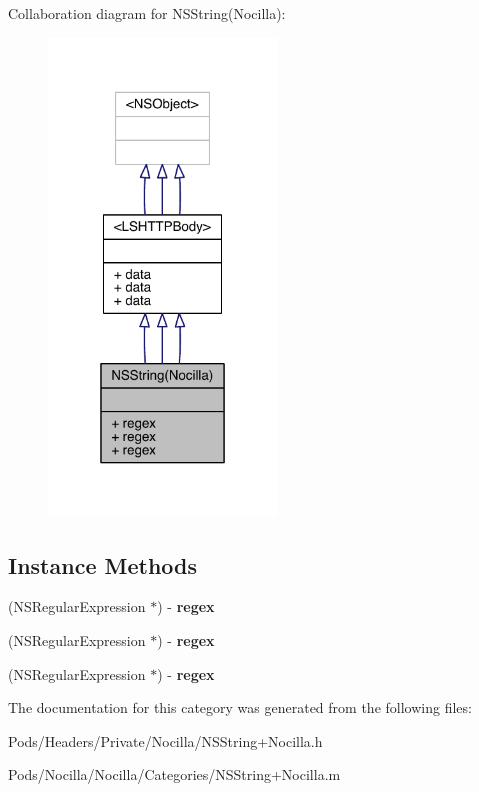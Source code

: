 Collaboration diagram for N\-S\-String(Nocilla)\-:\nopagebreak
\begin{figure}[H]
\begin{center}
\leavevmode
\includegraphics[width=172pt]{category_n_s_string_07_nocilla_08__coll__graph}
\end{center}
\end{figure}
\subsection*{Instance Methods}
\begin{DoxyCompactItemize}
\item 
\hypertarget{category_n_s_string_07_nocilla_08_a72d951dcb2d82a817c0bcf0ea7b38280}{(N\-S\-Regular\-Expression $\ast$) -\/ {\bfseries regex}}\label{category_n_s_string_07_nocilla_08_a72d951dcb2d82a817c0bcf0ea7b38280}

\item 
\hypertarget{category_n_s_string_07_nocilla_08_a72d951dcb2d82a817c0bcf0ea7b38280}{(N\-S\-Regular\-Expression $\ast$) -\/ {\bfseries regex}}\label{category_n_s_string_07_nocilla_08_a72d951dcb2d82a817c0bcf0ea7b38280}

\item 
\hypertarget{category_n_s_string_07_nocilla_08_a72d951dcb2d82a817c0bcf0ea7b38280}{(N\-S\-Regular\-Expression $\ast$) -\/ {\bfseries regex}}\label{category_n_s_string_07_nocilla_08_a72d951dcb2d82a817c0bcf0ea7b38280}

\end{DoxyCompactItemize}


The documentation for this category was generated from the following files\-:\begin{DoxyCompactItemize}
\item 
Pods/\-Headers/\-Private/\-Nocilla/N\-S\-String+\-Nocilla.\-h\item 
Pods/\-Nocilla/\-Nocilla/\-Categories/N\-S\-String+\-Nocilla.\-m\end{DoxyCompactItemize}
